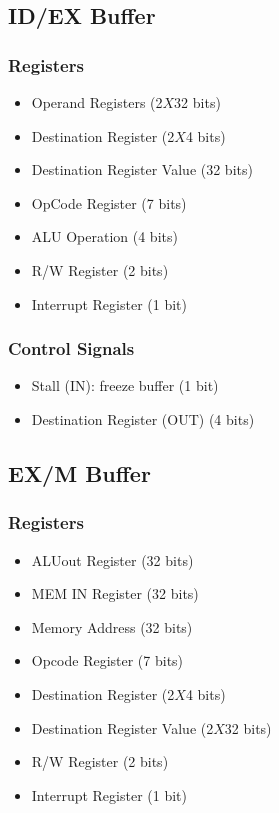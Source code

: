 \subsection{ID/EX Buffer}
\subsubsection{Registers}
\begin{itemize}
    \item Operand Registers (2$X$32 bits)
    \item Destination Register (2$X$4 bits)
    \item Destination Register Value (32 bits)
    \item OpCode Register (7 bits)
    \item ALU Operation (4 bits)
    \item R/W Register (2 bits)
    \item Interrupt Register (1 bit)
\end{itemize}

\subsubsection{Control Signals}
\begin{itemize}
    \item Stall (IN): freeze buffer (1 bit)
    \item Destination Register (OUT) (4 bits)
\end{itemize}

\subsection{EX/M Buffer}
\subsubsection{Registers}
\begin{itemize}
    \item ALUout Register (32 bits)
    \item MEM IN Register (32 bits)
    \item Memory Address (32 bits)
    \item Opcode Register (7 bits)
    \item Destination Register (2$X$4 bits)
    \item Destination Register Value (2$X$32 bits)
    \item R/W Register (2 bits)
    \item Interrupt Register (1 bit)
\end{itemize}

